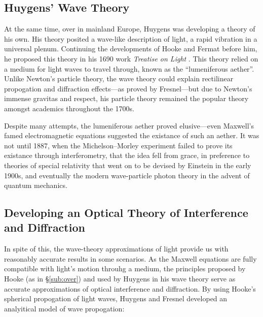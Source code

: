 \documentclass[a4paper]{article}
\begin{document}
\subsection{Huygens' Wave Theory} \label{sub:huyg}
At the same time, over in mainland Europe, Huygens was developing a theory of his own. His theory posited a wave-like description of light, a rapid vibration in a universal plenum. Continuing the developments of Hooke and Fermat before him, he proposed this theory in his 1690 work \emph{Treatise on Light} \cite{gut:huyg}. This theory relied on a medium for light waves to travel through, known as the ``lumeniferous aether''. Unlike Newton's particle theory, the wave theory could explain rectilinear propogation and diffraction effects---as proved by Fresnel---but due to Newton's immense gravitas and respect, his particle theory remained the popular theory amongst academics throughout the 1700s.

Despite many attempts, the lumeniferous aether proved elusive---even Maxwell's famed electromagnetic equations suggested the existance of such an aether. It was not until 1887, when the Michelson–Morley experiment failed to prove its existance through interferometry, that the idea fell from grace, in preference to theories of special relativity that went on to be devised by Einstein in the early 1900s, and eventually the modern wave-particle photon theory in the advent of quantum mechanics.

\subsection{Developing an Optical Theory of Interference and Diffraction} \label{sec:dev_theory}

In spite of this, the wave-theory approximations of light provide us with reasonably accurate results in some scenarios. As the Maxwell equations are fully compatible with light's motion throuhg a medium, the principles proposed by Hooke (as in \S\ref{sub:over}) and used by Huygens in his wave theory serve as accurate approximations of optical interference and diffraction. By using Hooke's spherical propogation of light waves, Huygens and Fresnel developed an analyitical model of wave propogation:
\end{document}
